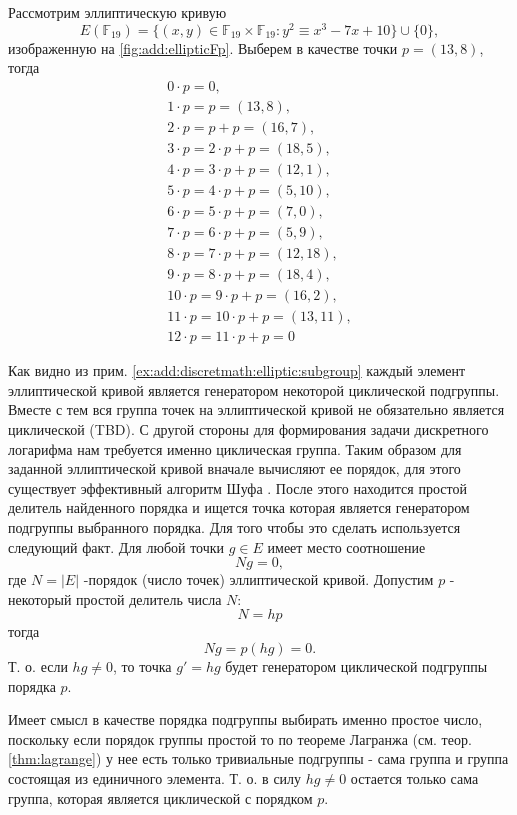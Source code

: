 \begin{example}
Рассмотрим эллиптическую кривую 
\[
E\left(\mathbb{F}_{19}\right) = 
\{(x,y) \in \mathbb{F}_{19} \times \mathbb{F}_{19}: y^2 \equiv x^3 -7 x +
10 \} \cup \{0\}, 
\] 
изображенную на \autoref{fig:add:ellipticFp}. Выберем
в качестве точки $p = (13, 8)$, тогда 
\begin{eqnarray}
0 \cdot p = 0, \nonumber \\
1 \cdot p = p = (13,8), \nonumber \\
2 \cdot p = p + p = (16,7), \nonumber \\
3 \cdot p = 2 \cdot p + p = (18,5), \nonumber \\
4 \cdot p = 3 \cdot p + p = (12,1), \nonumber \\
5 \cdot p = 4 \cdot p + p = (5,10), \nonumber \\
6 \cdot p = 5 \cdot p +p = (7,0), \nonumber \\
7 \cdot p = 6 \cdot p + p = (5,9), \nonumber \\
8 \cdot p = 7 \cdot p +p = (12,18), \nonumber \\
9 \cdot p = 8 \cdot p + p = (18,4), \nonumber \\
10 \cdot p = 9 \cdot p + p = (16,2), \nonumber \\
11 \cdot p = 10 \cdot p + p = (13,11), \nonumber \\
12 \cdot p = 11 \cdot p + p = 0
\nonumber 
\end{eqnarray}
\label{ex:add:discretmath:elliptic:subgroup}
\end{example}
Как видно из прим. \ref{ex:add:discretmath:elliptic:subgroup} каждый
элемент эллиптической кривой является генератором некоторой
циклической подгруппы. Вместе с тем вся группа точек на эллиптической
кривой не обязательно является циклической 
(TBD).
С другой стороны для формирования задачи дискретного логарифма нам
требуется именно циклическая группа. Таким образом для заданной
эллиптической кривой вначале вычисляют ее порядок, для этого
существует эффективный алгоритм Шуфа \cite{ReneSchoof:1985}. После
этого находится простой делитель найденного порядка и ищется точка
которая является генератором подгруппы выбранного порядка. Для того
чтобы это сделать используется следующий факт. Для любой точки 
$g \in E$ имеет место соотношение
\[
N g = 0,
\]
где $N = \left|E\right|$ -порядок (число точек) эллиптической кривой.
Допустим $p$ - некоторый простой делитель числа $N$:
\[
N = h p
\]
тогда
\[
N g = p \left( h g \right) = 0.
\]
Т. о. если $hg \ne 0$, то точка $g' = h g$ будет генератором
циклической подгруппы порядка $p$.
\begin{remark}
Имеет смысл в качестве порядка подгруппы выбирать именно простое
число, поскольку если порядок группы простой то по теореме Лагранжа
(см. теор. \ref{thm:lagrange})  у нее есть
только тривиальные подгруппы - сама группа и группа состоящая из
единичного элемента. Т. о. в силу $hg \ne 0$ остается только сама
группа, которая является циклической с порядком $p$. 
\end{remark}

